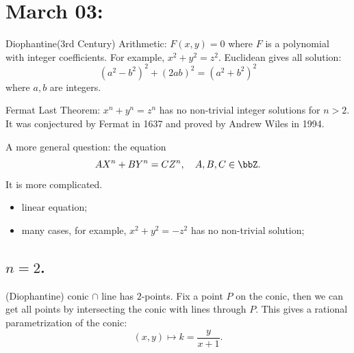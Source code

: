 \section{March 03:}

        


    Diophantine(3rd Century)
    Arithmetic: \(F(x,y) = 0\) where \(F\) is a polynomial with integer coefficients. 
    For example, \(x^2 + y^2 = z^2\).
    Euclidean gives all solution:
    \[ (a^2 - b^2)^2 + (2ab)^2 = (a^2 + b^2)^2 \]
    where \(a,b\) are integers.

    Fermat Last Theorem: \(x^n + y^n = z^n\) has no non-trivial integer solutions for \(n > 2\).
    It was conjectured by Fermat in 1637 and proved by Andrew Wiles in 1994.

    A more general question: the equation
    \[ AX^n + BY^n = CZ^n, \quad A,B,C \in \bbZ. \]
    It is more complicated.
    \begin{itemize}
        \item [\(n=1\)] linear equation;
        \item [\(n=2\)] many cases, for example, \(x^2 + y^2 = -z^2\) has no non-trivial solution;
    \end{itemize}

\subsection[n=2]{\(n=2\).}

    (Diophantine) conic \(\cap\) line has \(2\)-points.
    Fix a point \(P\) on the conic, then we can get all points by intersecting the conic with lines through \(P\).
    This gives a rational parametrization of the conic:
    \[ (x,y) \mapsto k=\frac{y}{x+1}. \]


